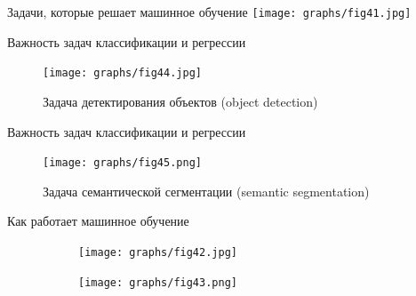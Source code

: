 \documentclass[aspectratio=169]{beamer}
\begin{document}
\begin{frame}{Задачи, которые решает машинное обучение}
    \centering
    \texttt{[image: graphs/fig41.jpg]}
\end{frame}

\begin{frame}{Важность задач классификации и регрессии}
    \begin{figure}
        \centering
        \texttt{[image: graphs/fig44.jpg]}
        \caption{Задача детектирования объектов (object detection)}
    \end{figure}
\end{frame}

\begin{frame}{Важность задач классификации и регрессии}
    \begin{figure}
        \centering
        \texttt{[image: graphs/fig45.png]}
        \caption{Задача семантической сегментации (semantic segmentation)}
    \end{figure}
\end{frame}

\begin{frame}{Как работает машинное обучение}
    \begin{figure}
        \begin{subfigure}[b]{0.49\linewidth}
            \texttt{[image: graphs/fig42.jpg]}
        \end{subfigure}
        \pause{}
        \begin{subfigure}[b]{0.49\linewidth}
            \texttt{[image: graphs/fig43.png]}
        \end{subfigure}
    \end{figure}
\end{frame}
\end{document}

